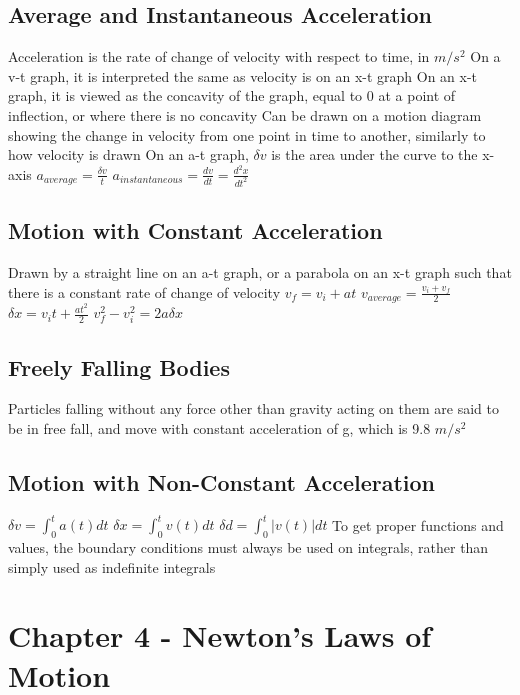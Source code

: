 \documentclass[11 pt, twoside]{article}
\newenvironment{outline*}
{
	\begin{outline}[enumerate]
	}
	{\end{outline}
}
\begin{document}
\subsection{Average and Instantaneous Acceleration}
\begin{outline*}
\1 Acceleration is the rate of change of velocity with respect to time, in $m/s^2$
\2 On a v-t graph, it is interpreted the same as velocity is on an x-t graph
\2 On an x-t graph, it is viewed as the concavity of the graph, equal to 0 at a point of inflection, or where there is no concavity
\2 Can be drawn on a motion diagram showing the change in velocity from one point in time to another, similarly to how velocity is drawn
\2 On an a-t graph, $\delta v$ is the area under the curve to the x-axis
\1 $a_{average} = \frac{\delta v}{t}$
\1 $a_{instantaneous} = \frac{dv}{dt} = \frac{d^2x}{dt^2}$
\end{outline*}
\subsection{Motion with Constant Acceleration}
\begin{outline*}
\1 Drawn by a straight line on an a-t graph, or a parabola on an x-t graph such that there is a constant rate of change of velocity
\1 $v_f = v_i + at$
\1 $v_{average} = \frac{v_i + v_f}{2}$
\1 $\delta x = v_it + \frac{at^2}{2}$
\1 $v_f^2 - v_i^2 = 2a\delta x$
\end{outline*}
\subsection{Freely Falling Bodies}
\begin{outline*}
\1 Particles falling without any force other than gravity acting on them are said to be in free fall, and move with constant acceleration of g, which is 9.8 $m/s^2$
\end{outline*}
\subsection{Motion with Non-Constant Acceleration}
\begin{outline*}
\1 $\delta v = \int_0^t a(t)dt$
\1 $\delta x = \int_0^t v(t)dt$
\1 $\delta d = \int_0^t |v(t)|dt$
\1 To get proper functions and values, the boundary conditions must always be used on integrals, rather than simply used as indefinite integrals
\end{outline*}
\section{Chapter 4 - Newton's Laws of Motion}
\end{document}
